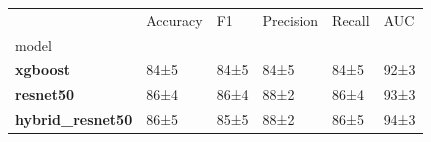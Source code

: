 \begin{tabular}{llllll}
\toprule
 & Accuracy & F1 & Precision & Recall & AUC \\
model &  &  &  &  &  \\
\midrule
\textbf{xgboost} & 84±5 & 84±5 & 84±5 & 84±5 & 92±3 \\
\textbf{resnet50} & 86±4 & 86±4 & 88±2 & 86±4 & 93±3 \\
\textbf{hybrid_resnet50} & 86±5 & 85±5 & 88±2 & 86±5 & 94±3 \\
\bottomrule
\end{tabular}
